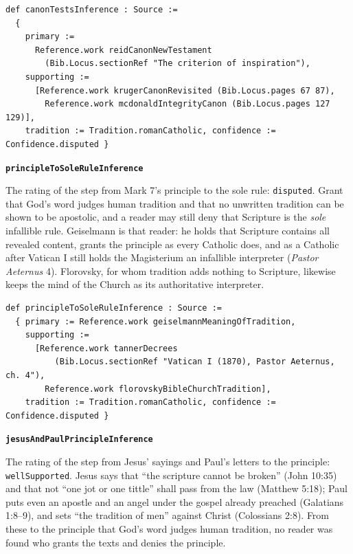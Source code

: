 \documentclass[11pt]{article}
\begin{document}
{\small\begin{verbatim}
def canonTestsInference : Source :=
  {
    primary :=
      Reference.work reidCanonNewTestament
        (Bib.Locus.sectionRef "The criterion of inspiration"),
    supporting :=
      [Reference.work krugerCanonRevisited (Bib.Locus.pages 67 87),
        Reference.work mcdonaldIntegrityCanon (Bib.Locus.pages 127 129)],
    tradition := Tradition.romanCatholic, confidence := Confidence.disputed }
\end{verbatim}}
\par\medskip\noindent\textbf{\texttt{principle\allowbreak{}To\allowbreak{}Sole\allowbreak{}Rule\allowbreak{}Inference}}\par\nobreak\noindent
The rating of the step from Mark 7’s principle to the sole rule: \texttt{disputed}. Grant that God’s word judges human tradition and that no unwritten tradition can be shown to be apostolic, and a reader may still deny that Scripture is the \emph{sole} infallible rule. Geiselmann is that reader: he holds that Scripture contains all revealed content, grants the principle as every Catholic does, and as a Catholic after Vatican I still holds the Magisterium an infallible interpreter (\emph{Pastor Aeternus} 4). Florovsky, for whom tradition adds nothing to Scripture, likewise keeps the mind of the Church as its authoritative interpreter.

{\small\begin{verbatim}
def principleToSoleRuleInference : Source :=
  { primary := Reference.work geiselmannMeaningOfTradition,
    supporting :=
      [Reference.work tannerDecrees
          (Bib.Locus.sectionRef "Vatican I (1870), Pastor Aeternus, ch. 4"),
        Reference.work florovskyBibleChurchTradition],
    tradition := Tradition.romanCatholic, confidence := Confidence.disputed }
\end{verbatim}}
\par\medskip\noindent\textbf{\texttt{jesus\allowbreak{}And\allowbreak{}Paul\allowbreak{}Principle\allowbreak{}Inference}}\par\nobreak\noindent
The rating of the step from Jesus’ sayings and Paul’s letters to the principle: \texttt{well\allowbreak{}Supported}. Jesus says that “the scripture cannot be broken” (John 10:35) and that not “one jot or one tittle” shall pass from the law (Matthew 5:18); Paul puts even an apostle and an angel under the gospel already preached (Galatians 1:8–9), and sets “the tradition of men” against Christ (Colossians 2:8). From these to the principle that God’s word judges human tradition, no reader was found who grants the texts and denies the principle.
\end{document}
